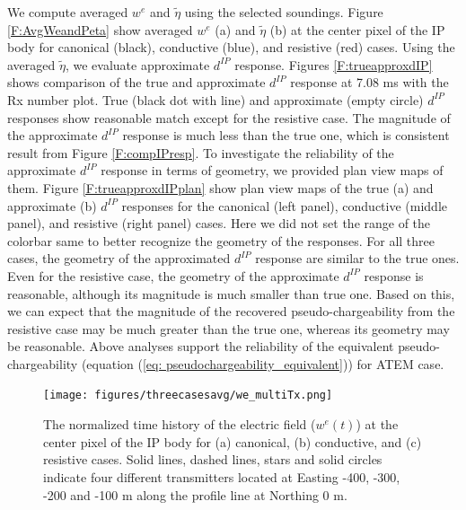 \documentclass[a4paper, 11pt]{article}
\newcommand{\peta}{\tilde{\eta}}
\newcommand{\dip}{d^{IP}}
\begin{document}
We compute averaged $w^e$ and $\peta$ using the selected soundings. Figure \ref{F:AvgWeandPeta} show averaged $w^e$ (a) and $\peta$ (b) at the center pixel of the IP body for canonical (black), conductive (blue), and resistive (red) cases.
Using the averaged $\peta$, we evaluate approximate $\dip$ response. Figures \ref{F:trueapproxdIP} shows comparison of the true and approximate $\dip$ response at 7.08 ms with the Rx number plot. True (black dot with line) and approximate (empty circle) $\dip$ responses show reasonable match except for the resistive case. The magnitude of the approximate $\dip$ response is much less than the true one, which is consistent result from Figure \ref{F:compIPresp}. To investigate the reliability of the approximate $\dip$ response in terms of geometry, we provided plan view maps of them. Figure \ref{F:trueapproxdIPplan} show plan view maps of the true (a) and  approximate (b) $\dip$ responses for the canonical (left panel), conductive (middle panel), and resistive (right panel) cases. Here we did not set the range of the colorbar same to better recognize the geometry of the responses. For all three cases, the geometry of the approximated $\dip$ response are similar to the true ones. Even for the resistive case, the geometry of the approximate $\dip$ response is reasonable, although its magnitude is much smaller than true one. Based on this, we can expect that the magnitude of the recovered pseudo-chargeability from the resistive case may be much greater than the true one, whereas its geometry may be reasonable. Above analyses support the reliability of the equivalent pseudo-chargeability (equation (\ref{eq: pseudochargeability_equivalent})) for ATEM case. 

\begin{figure}[htb]
  \centering  \texttt{[image: figures/threecasesavg/we\_multiTx.png]}
  \caption{The normalized time history of the electric field ($w^e(t)$) at the center pixel of the IP body for (a) canonical, (b) conductive, and (c) resistive cases. Solid lines, dashed lines, stars and solid circles indicate four different transmitters located at Easting -400, -300, -200 and -100 m  along the profile line at Northing 0 m. }
  \label{F:we_multiTx}
\end{figure}
\end{document}
